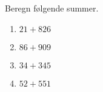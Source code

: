 \documentclass[../main.tex]{subfiles}
\begin{document}
\begin{prob}
    Beregn følgende summer.
    \begin{enumerate}[label=\alph*)]
        \item \(\displaystyle 21 + 826\)
        \vspace{3mm}
        \item \(\displaystyle 86 + 909\)
        \vspace{3mm}
        \item \(\displaystyle 34 + 345\)
        \vspace{3mm}
        \item \(\displaystyle 52 + 551\)
    \end{enumerate}
\end{prob}
\end{document}
